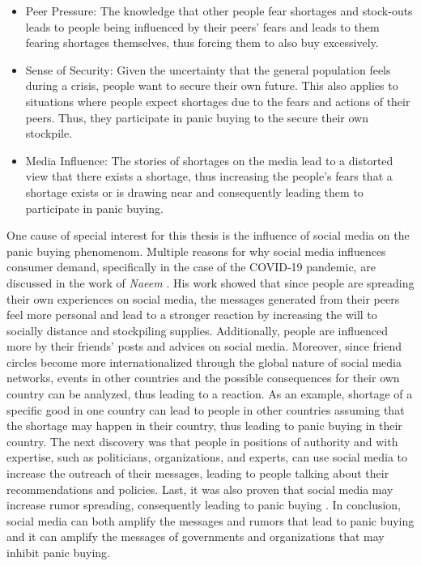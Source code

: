 \begin{itemize}
    \item Peer Pressure: The knowledge that other people fear shortages and 
    stock-outs leads to people being influenced by their peers' fears and leads
    to them fearing shortages themselves, thus forcing them to also buy excessively.
    \item Sense of Security: Given the uncertainty that the general population
    feels during a crisis, people want to secure their own future. This 
    also applies to situations where people expect 
    shortages due to the fears and actions of their peers.
    Thus, they participate in panic buying to the secure their
    own stockpile.
    \item Media Influence: The stories of shortages on the media
    lead to a distorted view that there exists a shortage, thus increasing 
    the people's fears that a shortage exists or is drawing near and consequently
    leading them to participate in panic buying.
\end{itemize}

One cause of special interest for this thesis is the influence of 
social media on the panic buying phenomenom. 
Multiple reasons for why social media influences consumer demand, 
specifically in the case of the COVID-19 pandemic,
are discussed in the work of \textit{Naeem} \cite{naeem2021social}.
His work showed that since people are spreading their 
own experiences on social media, the messages generated from their peers feel
more personal and lead to a stronger reaction by increasing the will to 
socially distance and stockpiling supplies. Additionally, people are 
influenced more by their friends' posts and advices on social media.
Moreover, since friend circles become more 
internationalized through the global nature of social media networks,
events in other countries and the
possible consequences for their own country can be analyzed, thus
leading to a reaction. As an example,
shortage of a specific good in one country can lead to people in other countries
assuming that the shortage may happen in their country, thus leading to 
panic buying in their country. 
The next discovery was that people in positions of authority and with expertise,
such as politicians, organizations, and experts, can use social media to increase 
the outreach of their messages, leading to people talking about their 
recommendations and policies.
Last, it was also proven that social media may increase rumor spreading,
consequently leading to panic buying \cite{naeem2022understanding}.
In conclusion, social media can both amplify the messages and rumors that lead to 
panic buying and it can amplify the messages of governments and organizations 
that may inhibit panic buying.



